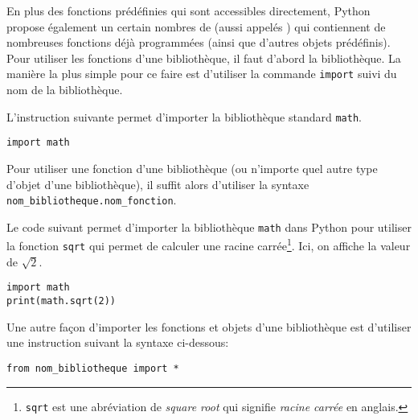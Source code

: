 En plus des fonctions prédéfinies qui sont accessibles directement, Python propose également un certain nombres de  (aussi appelés ) qui contiennent de nombreuses fonctions déjà programmées (ainsi que d'autres objets prédéfinis). Pour utiliser les fonctions d'une bibliothèque, il faut d'abord  la bibliothèque. La manière la plus simple pour ce faire est d'utiliser la commande \texttt{import} suivi du nom de la bibliothèque.
\begin{example}
	L'instruction suivante permet d'importer la bibliothèque standard \texttt{math}.
	\begin{center}
		\begin{varwidth}[t]{.5\textwidth}
			\begin{lstlisting}[language=iPython,linewidth = 4cm]
import math
\end{lstlisting}\end{varwidth}\end{center}
\end{example}
Pour utiliser une fonction d'une bibliothèque (ou n'importe quel autre type d'objet d'une bibliothèque), il suffit alors d'utiliser la syntaxe \texttt{nom\_bibliotheque.nom\_fonction}.
\begin{example}
	Le code suivant permet d'importer la bibliothèque \texttt{math} dans Python pour utiliser la fonction \texttt{sqrt} qui permet de calculer une racine carrée\footnote{\texttt{sqrt} est une abréviation de \textit{square root} qui signifie \textit{racine carrée} en anglais.}. Ici, on affiche la valeur de $\sqrt{2}$.
\begin{center}
	\begin{varwidth}[t]{.5\textwidth}
		\begin{lstlisting}[language=iPython,linewidth = 5cm]
import math
print(math.sqrt(2))
\end{lstlisting}\end{varwidth}\end{center}
\end{example}
Une autre façon d'importer les fonctions et objets d'une bibliothèque est d'utiliser une instruction suivant la syntaxe ci-dessous:
\begin{center}
	\begin{varwidth}[t]{.5\textwidth}
		\begin{lstlisting}[language=iPython,linewidth = 8cm]
from nom_bibliotheque import *
\end{lstlisting}\end{varwidth}\end{center}
